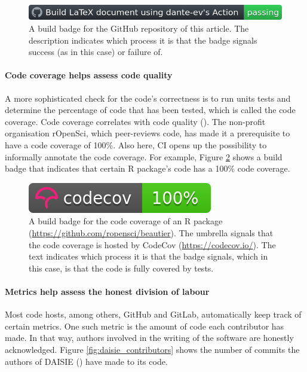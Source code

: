 \begin{figure}[!htbp]
  \centering
  \includegraphics[width=\linewidth]{build_badge.png}
  \caption{
    A build badge for the GitHub repository of this article.
    The description indicates which process it is that the badge
    signals success (as in this case) or failure of. 
  }
  \label{fig:build_badge}
\end{figure}

\paragraph{Code coverage helps assess code quality}

A more sophisticated check for the code's correctness is
to run units tests and determine the percentage of code that has been
tested, which is called the code coverage. Code coverage
correlates with code quality (\cite{horgan1994,del1995correlation}). 
The non-profit organisation rOpenSci, which peer-reviews code,
has made it a prerequisite to have a code coverage of 100\%.
Also here, CI opens up the possibility to informally annotate the
code coverage. For example, Figure \ref{fig:badge_codecov} shows a 
build badge that indicates that certain R package's code 
has a 100\% code coverage.

\begin{figure}[!htbp]
  \centering
  \includegraphics[]{badge_codecov.png}
  \caption{
    A build badge for the code coverage of an R 
    package (\url{https://github.com/ropensci/beautier}).
    The umbrella signals that the code coverage is hosted by
    CodeCov (\url{https://codecov.io/}). 
    The text indicates which process it is that the badge
    signals, which in this case, is that the code is fully covered
    by tests.
  }
  \label{fig:badge_codecov}
\end{figure}

\paragraph{Metrics help assess the honest division of labour}

Most code hosts, among others, GitHub and GitLab,
automatically keep track of certain metrics.
One such metric is the amount of code each contributor has made.
In that way, authors involved in the writing of the software
are honestly acknowledged. Figure \ref{fig:daisie_contributors}
shows the number of commits the authors of DAISIE (\cite{etienne2020daisie})
have made to its code.

